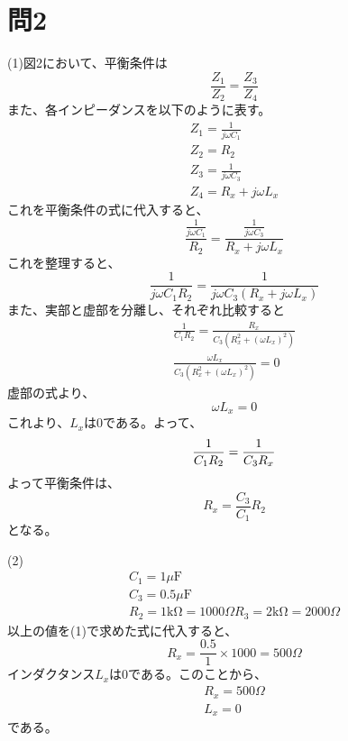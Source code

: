 \documentclass[a4paper,11pt]{ltjsarticle}
\begin{document}
\section*{問2}
(1)図2において、平衡条件は
\begin{equation*}
  \frac{Z_{1}}{Z_{2}} = \frac{Z_{3}}{Z_{4}}
\end{equation*}
また、各インピーダンスを以下のように表す。
\begin{gather*}
  Z_{1} = \frac{1}{j\omega C_{1}} \\
  Z_{2} = R_{2} \\
  Z_{3} = \frac{1}{j\omega C _{3}}\\
  Z_{4} = R_{x} + j\omega L_{x}
\end{gather*}
これを平衡条件の式に代入すると、
\begin{equation*}
  \frac{\frac{1}{j\omega C_{1}}}{R_{2}} = 
  \frac{\frac{1}{j\omega C_{3}}}{R_{x}+j\omega L_{x}}
\end{equation*}
これを整理すると、
\begin{equation*}
\frac{1}{j\omega C_{1}R_{2}} = \frac{1}{j\omega C_{3}(R_{x}+j\omega L_{x})}
\end{equation*}
また、実部と虚部を分離し、それぞれ比較すると
\begin{gather*}
  \frac{1}{C_{1}R_{2}} = \frac{R_{x}}{C_{3}(R_{x}^{2}+(\omega L_{x})^{2})} \\
  \frac{\omega L_{x}}{C_{3}(R_{x}^{2} + (\omega L_{x})^{2})} = 0
\end{gather*}
虚部の式より、
\begin{equation*}
  \omega L_{x} = 0
\end{equation*}
これより、$L_{x}$は0である。よって、
\begin{equation*}
  \frac{1}{C_{1}R_{2}} = \frac{1}{C_{3}R_{x}} \\
\end{equation*}
よって平衡条件は、
\begin{equation*}
  R_{x} = \frac{C_{3}}{C_{1}}R_{2}
\end{equation*}
となる。

(2)
\begin{gather*}
  C_{1} = 1\mu\mathrm{F} \\
  C_{3} = 0.5\mu\mathrm{F} \\
  R_{2} = 1\mathrm{k\Omega} = 1000\Omega
  R_{3} = 2\mathrm{k\Omega} = 2000\Omega
\end{gather*}
以上の値を(1)で求めた式に代入すると、
\begin{equation*}
  R_{x} = \frac{0.5}{1} \times 1000 = 500\Omega
\end{equation*}
インダクタンス$L_{x}$は0である。このことから、
\begin{gather*}
  R_{x} = 500\Omega \\
  L_{x} = 0
\end{gather*}
である。
\end{document}
